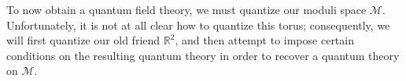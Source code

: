 \documentclass[12pt]{article}
\begin{document}
To now obtain a quantum field theory, we must quantize our moduli space $\mathcal{M}$. Unfortunately, it is not at all clear how to quantize this torus; consequently, we will first quantize our old friend $\mathbb{R}^2$, and then attempt to impose certain conditions on the resulting quantum theory in order to recover a quantum theory on $\mathcal{M}$.
\end{document}
